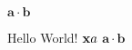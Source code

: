 \documentclass{minimal}
\renewcommand{\vec}[1]{\mathbf{#1}}
\begin{document}
$\vec{a}\cdot\vec{b}$



Hello World!
$\mathbf{x}{a}$
$\vec{a}\cdot\vec{b}$
\end{document}
